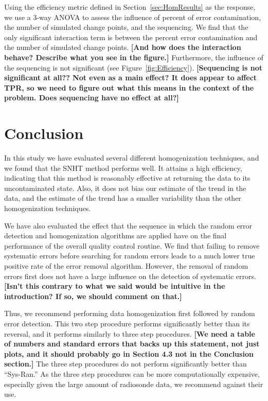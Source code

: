 \documentclass[12pt]{article}
\begin{document}
\begin{doublespacing}
Using the efficiency metric defined in Section~\ref{sec:HomResults} as the response,  we use a 3-way ANOVA to assess the influence of percent of error contamination, the number of simulated change points, and the sequencing.  We find that the only significant interaction term is between the percent error contamination and the number of simulated change points.  \textbf{[And how does the interaction behave?  Describe what you see in the figure.]} Furthermore, the influence of the sequencing is not significant (see Figure~\ref{fig:Efficiency}). \textbf{[Sequencing is not significant at all??  Not even as a main effect? It does appear to affect TPR, so we need to figure out what this means in the context of the problem.  Does sequencing have no effect at all?]}

\section{Conclusion}



In this study we have evaluated several different homogenization techniques, and we found that the SNHT method performs well.  It attains a high efficiency, indicating that this method is reasonably effective at returning the data to its uncontaminated state.  Also, it does not bias our estimate of the trend in the data, and the estimate of the trend has a smaller variability than the other homogenization techniques.

We have also evaluated the effect that the sequence in which the random error detection and homogenization algorithms are applied have on the final performance of the overall quality control routine.  We find that failing to remove systematic errors before searching for random errors leads to a much lower true positive rate of the error removal algorithm.  However,  the removal of random errors first does not have a large influence on the detection of systematic errors. \textbf{[Isn't this contrary to what we said would be intuitive in the introduction?  If so, we should comment on that.]}

Thus, we recommend performing data homogenization first followed by random error detection.  This two step procedure performs significantly better than its reversal, and it performs similarly to three step procedures. \textbf{[We need a table of numbers and standard errors that backs up this statement, not just plots, and it should probably go in Section 4.3 not in the Conclusion section.]}  The three step procedures do not perform significantly better than ``Sys-Ran.''  As the three step procedures can be more computationally expensive, especially given the large amount of radiosonde data, we recommend against their use.

\end{doublespacing}
\end{document}

